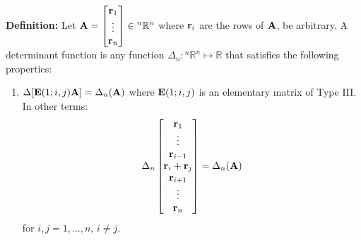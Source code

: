 \documentclass{article}
\begin{document}
\begin{minipage}[t]{.45\linewidth}
        \textbf{Definition:} Let $\mathbf{A} = \begin{bmatrix}
            \mathbf{r}_1 \\ \vdots \\ \mathbf{r}_n
        \end{bmatrix} \in {^n}\mathbb{R}^n$ where $\mathbf{r}_i$ are the rows of $\mathbf{A}$, be arbitrary. A determinant function is any function $\Delta_n: {^n}\mathbb{R}^n \mapsto \mathbb{R}$ that satisfies the following properties:
        \vspace{2mm}

        \begin{enumerate}[label=D\Roman*]
            \item $\Delta[\mathbf{E}(1;i,j)\mathbf{A}]=\Delta_n(\mathbf{A})$ where $\mathbf{E}(1;i,j)$ is an elementary matrix of Type III. In other terms:
            \begin{equation*}
                \Delta_n\begin{bmatrix}
                    \mathbf{r}_1 \\ \vdots \\ \mathbf{r}_{i-1} \\ \mathbf{r}_i+\mathbf{r}_j \\ \mathbf{r}_{i+1} \\ \vdots \\ \mathbf{r}_n
                \end{bmatrix} = \Delta_n(\mathbf{A})
            \end{equation*}
            for $i,j=1,\dots, n$, $i\neq j$.
        \end{enumerate}
    \end{minipage}\hfill
\end{document}
